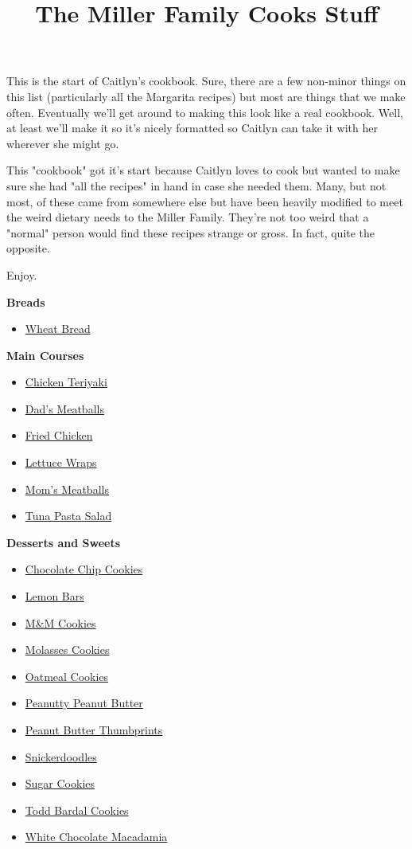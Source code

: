\documentclass{article}
\title{The Miller Family Cooks Stuff}
\begin{document}
This is the start of Caitlyn's cookbook. Sure, there are a few non-minor things on this list (particularly all the Margarita recipes) but most are things that we make often. Eventually
we'll get around to making this look like a real cookbook. Well, at least we'll make it so
it's nicely formatted so Caitlyn can take it with her wherever she might go.

This "cookbook" got it's start because Caitlyn loves to cook but wanted to make sure she
had "all the recipes" in hand in case she needed them. Many, but not most, of these came
from somewhere else but have been heavily modified to meet the weird dietary needs to the
Miller Family. They're not too weird that a "normal" person would find these recipes
strange or gross. In fact, quite the opposite.

Enjoy.

\textbf{Breads}
\begin{itemize}
    \item \href{wheat-bread.pdf}{Wheat Bread}
\end{itemize}

\medskip

\textbf{Main Courses}
\begin{itemize}
    \item \href{chicken-teriyaki.pdf}{Chicken Teriyaki}
    \item \href{dads-meatballs.pdf}{Dad's Meatballs}
    \item \href{fried-chicken.pdf}{Fried Chicken}
    \item \href{lettuce-wraps.pdf}{Lettuce Wraps}
    \item \href{moms-meatballs.pdf}{Mom's Meatballs}
    \item \href{tuna-pasta-salad.pdf}{Tuna Pasta Salad}
\end{itemize}

\medskip

\textbf{Desserts and Sweets}
\begin{itemize}
    \item \href{chocolate-chip.pdf}{Chocolate Chip Cookies}
    \item \href{lemon-bars.pdf}{Lemon Bars}
    \item \href{m-and-m-cookies.pdf}{M\&M Cookies}
    \item \href{molasses-cookies.pdf}{Molasses Cookies}
    \item \href{oatmeal-cookies.pdf}{Oatmeal Cookies}
    \item \href{peanut-butter.pdf}{Peanutty Peanut Butter}
    \item \href{peanut-butter-thumbprints.pdf}{Peanut Butter Thumbprints}
    \item \href{snickerdoodles.pdf}{Snickerdoodles}
    \item \href{sugar-cookies.pdf}{Sugar Cookies}
    \item \href{todd-bardal.pdf}{Todd Bardal Cookies}
    \item \href{white-choco-macadamia.pdf}{White Chocolate Macadamia}
\end{itemize}
\end{document}
